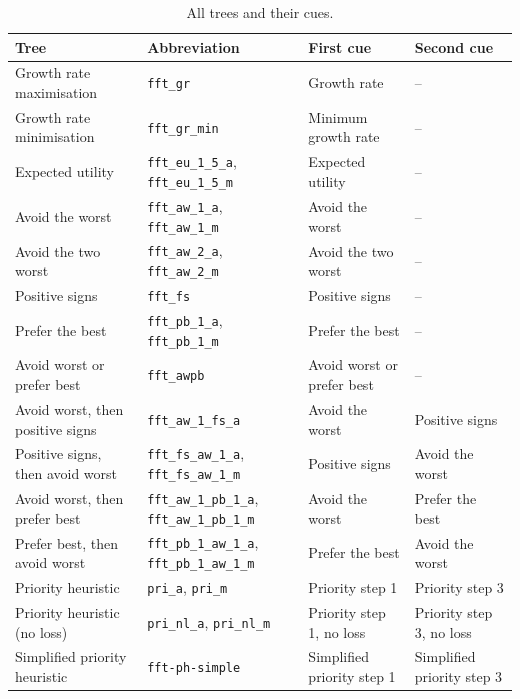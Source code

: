 \begin{table}[t]
  \centering
  \footnotesize
  \renewcommand{\arraystretch}{1.3}
  \setlength{\tabcolsep}{3pt}
  \caption{All trees and their cues.}
  \label{tab:ffts}
  \vspace{4pt}
  \begin{tabular}{|>{\raggedright\arraybackslash}p{2.95cm}|>{\raggedright\arraybackslash}p{2.6cm}|>{\raggedright\arraybackslash}p{3.15cm}|>{\raggedright\arraybackslash}p{3.05cm}|}
    \hline
    \textbf{Tree} & \textbf{Abbreviation} & \textbf{First cue} & \textbf{Second cue} \\
    \hline
    Growth rate maximisation & \texttt{fft\_gr} & Growth rate & -- \\
    \hline
    Growth rate minimisation & \texttt{fft\_gr\_min} & Minimum growth rate & -- \\
    \hline
    Expected utility & \texttt{fft\_eu\_1\_5\_a}, \texttt{fft\_eu\_1\_5\_m} & Expected utility & -- \\
    \hline
    Avoid the worst & \texttt{fft\_aw\_1\_a}, \texttt{fft\_aw\_1\_m} & Avoid the worst & -- \\
    \hline
    Avoid the two worst & \texttt{fft\_aw\_2\_a}, \texttt{fft\_aw\_2\_m} & Avoid the two worst & -- \\
    \hline
    Positive signs & \texttt{fft\_fs} & Positive signs & -- \\
    \hline
    Prefer the best & \texttt{fft\_pb\_1\_a}, \texttt{fft\_pb\_1\_m} & Prefer the best & -- \\
    \hline
    Avoid worst or prefer best & \texttt{fft\_awpb} & Avoid worst or prefer best & -- \\
    \hline
    Avoid worst, then positive signs & \texttt{fft\_aw\_1\_fs\_a} & Avoid the worst & Positive signs \\
    \hline
    Positive signs, then avoid worst & \texttt{fft\_fs\_aw\_1\_a}, \texttt{fft\_fs\_aw\_1\_m} & Positive signs & Avoid the worst \\
    \hline
    Avoid worst, then prefer best & \texttt{fft\_aw\_1\_pb\_1\_a}, \texttt{fft\_aw\_1\_pb\_1\_m} & Avoid the worst & Prefer the best \\
    \hline
    Prefer best, then avoid worst & \texttt{fft\_pb\_1\_aw\_1\_a}, \texttt{fft\_pb\_1\_aw\_1\_m} & Prefer the best & Avoid the worst \\
    \hline
    Priority heuristic & \texttt{pri\_a}, \texttt{pri\_m} & Priority step 1 & Priority step 3 \\
    \hline
    Priority heuristic (no loss) & \texttt{pri\_nl\_a}, \texttt{pri\_nl\_m} & Priority step 1, no loss & Priority step 3, no loss \\
    \hline
    Simplified priority heuristic & \texttt{fft-ph-simple} & Simplified priority step 1 & Simplified priority step 3 \\
    \hline
  \end{tabular}
\end{table}

